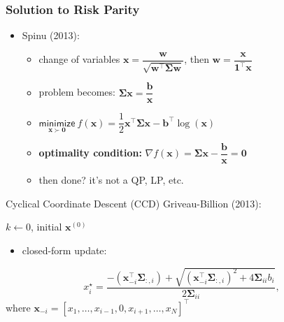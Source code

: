 \documentclass{beamer}
\begin{document}
        \begin{frame}
          \frametitle{Solution to Risk Parity}
          \vspace{.5cm}
          \begin{itemize}
            \item Spinu (2013):
            \begin{itemize}
            \item change of variables $\bm{x} = \dfrac{\bm{w}}{\sqrt{\bm{w}^\top\boldsymbol{\Sigma}\bm{w}}}$, then $\bm{w} = \dfrac{\bm{x}}{\mathbf{1}^\top\bm{x}}$
            \item problem becomes: $\boldsymbol{\Sigma}\bm{x} = \dfrac{\bm{b}}{\bm{x}}$
            \item $\underset{\bm{x} \succ \mathbf{0}}{\textsf{minimize}} ~f(\bm{x}) = \dfrac{1}{2}\bm{x}^\top\boldsymbol{\Sigma}\bm{x} - \bm{b}^\top\log(\bm{x})$
            \item \textbf{optimality condition:} $\nabla f(\bm{x}) = \boldsymbol{\Sigma}\bm{x} - \dfrac{\bm{b}}{\bm{x}} = \mathbf{0}$
            \item then done? it's not a QP, LP, etc.
           \end{itemize}
          \end{itemize}
        \end{frame}

        \begin{frame}{Cyclical Coordinate Descent (CCD)}
          \vspace{.5cm}
          Griveau-Billion (2013):

          \begin{algorithm}[H]
            \SetAlgoLined
            \caption{CCD to solve risk parity}
            $k \leftarrow 0$, initial $\bm{x}^{(0)}$\\
          \end{algorithm}
          \begin{itemize}
            \item closed-form update:
          \end{itemize}
          \begin{equation*}
            x_i^\star = \frac{-\left(\bm{x}_{-i}^\top\boldsymbol{\Sigma}_{:,i}\right)+\sqrt{\left(\bm{x}_{-i}^\top\boldsymbol{\Sigma}_{:,i}\right)^2+
            4\boldsymbol{\Sigma}_{ii}b_i}}{2\boldsymbol{\Sigma}_{ii}},
          \end{equation*}
          where $\bm{x}_{-i} = \left[x_1, \dots, x_{i-1}, 0, x_{i+1}, \dots, x_{N}\right]^\top$
        \end{frame}
\end{document}
